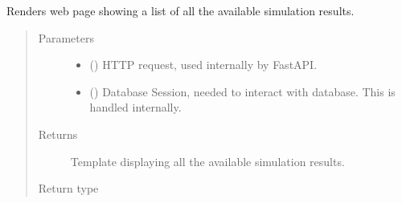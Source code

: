 \documentclass[a4paper,landscape,10pt,english]{sphinxmanual}
\begin{document}
\begin{fulllineitems}
\label{\detokenize{code_docs/simulation_API.controller:simulation_API.controller.main.results}}
Renders web page showing a list of all the available simulation results.
\begin{quote}\begin{description}
\item[{Parameters}] \leavevmode\begin{itemize}
\item {} 
 () \textendash{} HTTP request, used internally by FastAPI.

\item {} 
 () \textendash{} Database Session, needed to interact with database. This is handled
internally.

\end{itemize}

\item[{Returns}] \leavevmode
Template displaying all the available simulation results.

\item[{Return type}] \leavevmode
{}

\end{description}\end{quote}

\end{fulllineitems}

\end{document}
